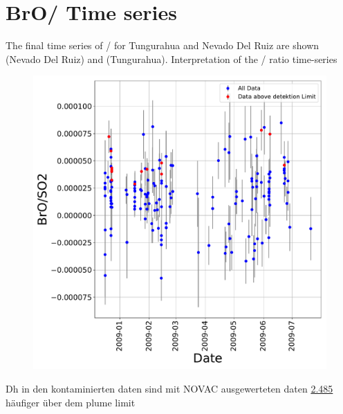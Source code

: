 \documentclass  [
  paper    = a4,
  BCOR     = 10mm,
  twoside,
  fontsize = 12pt,
  fleqn,
  toc      = bibnumbered,
  toc      = listofnumbered,
  numbers  = noendperiod,
  headings = normal,
  listof   = leveldown,
  version  = 3.03
]                                       {scrreprt}
\begin{document}
\section{BrO/  Time series}
The final time series of /  for Tungurahua and Nevado Del Ruiz are shown  (Nevado Del Ruiz) and  (Tungurahua).
	Interpretation of the / ratio time-series
	\begin{figure}
		\centering
		\includegraphics[width=0.7\linewidth]{Bilder/Results/Results_Tungurahua}
		\caption{}
		\label{fig:resultstungurahua}
	\end{figure}



	\begin{small}	
%

	Dh in den kontaminierten daten sind mit NOVAC ausgewerteten daten \underline{2.485} häufiger über dem plume limit\\	

	\end{small}
\end{document}
